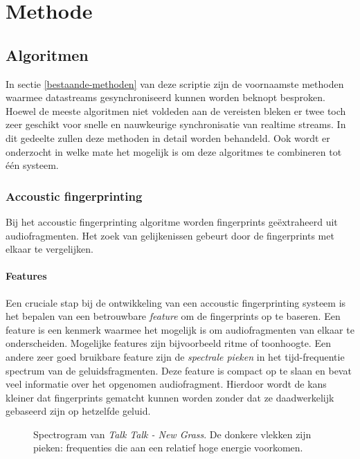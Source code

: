 \chapter{Methode}

\section{Algoritmen}

In sectie \ref{bestaande-methoden} van deze scriptie zijn de voornaamste methoden waarmee datastreams gesynchroniseerd kunnen worden beknopt besproken. Hoewel de meeste algoritmen niet voldeden aan de vereisten bleken er twee toch zeer geschikt voor snelle en nauwkeurige synchronisatie van realtime streams. In dit gedeelte zullen deze methoden in detail worden behandeld. Ook wordt er onderzocht in welke mate het mogelijk is om deze algoritmes te combineren tot één systeem.

\subsection{Accoustic fingerprinting}
\label{accoustic-fingerprinting}

Bij het accoustic fingerprinting algoritme worden fingerprints geëxtraheerd uit audiofragmenten. Het zoek van gelijkenissen gebeurt door de fingerprints met elkaar te vergelijken. 

\subsubsection{Features}

Een cruciale stap bij de ontwikkeling van een accoustic fingerprinting systeem is het bepalen van een betrouwbare \textit{feature} om de fingerprints op te baseren. Een feature is een kenmerk waarmee het mogelijk is om audiofragmenten van elkaar te onderscheiden. Mogelijke features zijn bijvoorbeeld ritme of toonhoogte. Een andere zeer goed bruikbare feature zijn de \textit{spectrale pieken} in het tijd-frequentie spectrum van de geluidsfragmenten. Deze feature is compact op te slaan en bevat veel informatie over het opgenomen audiofragment. Hierdoor wordt de kans kleiner dat fingerprints gematcht kunnen worden zonder dat ze daadwerkelijk gebaseerd zijn op hetzelfde geluid.

\begin{figure}[h!]
	\captionsetup{width=0.7\textwidth}
	\caption[Voorbeeld van een spectrogram]{Spectrogram van \textit{Talk Talk - New Grass}. De donkere vlekken zijn pieken: frequenties die aan een relatief hoge energie voorkomen.}
	\begin{center}
		\advance\parskip0.3cm
		
	\end{center}
\end{figure}

